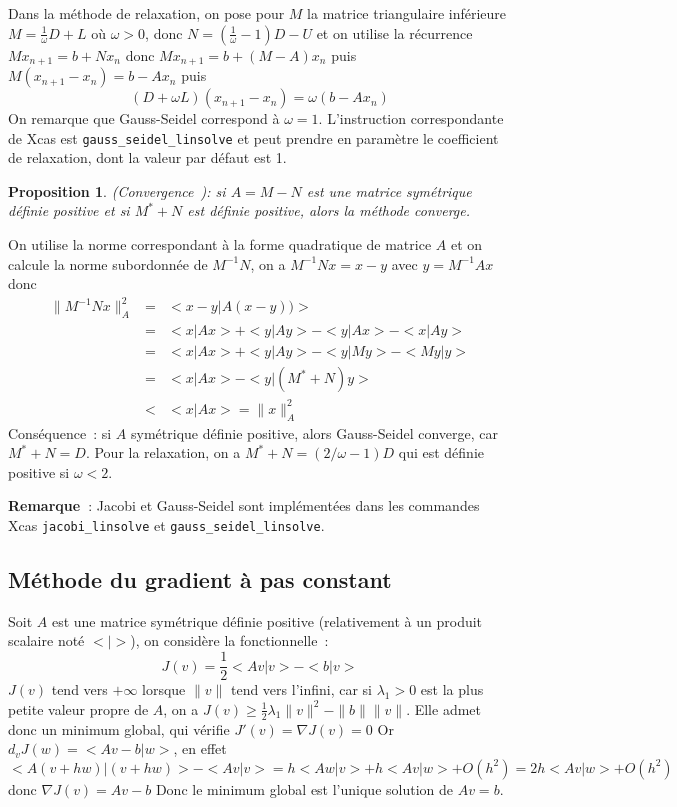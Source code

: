 \documentclass[a4paper,11pt]{book}
\newtheorem{prop}[thm]{Proposition}
\begin{document}
\begin{giacjshere}
Dans la m\'ethode de relaxation, on pose pour $M$ la matrice triangulaire
inf\'erieure $M=\frac1\omega D+L$ o\`u $\omega >0$, donc
$N=(\frac1\omega-1) D-U$
et on utilise la r\'ecurrence $Mx_{n+1}=b+Nx_n$ donc
$Mx_{n+1}=b+(M-A)x_n$ puis
$M(x_{n+1}-x_n)=b-Ax_n$ puis
$$ (D+\omega L) (x_{n+1}-x_n) = \omega(b-Ax_n)$$
On remarque que Gauss-Seidel correspond \`a $\omega=1$.
L'instruction correspondante de Xcas est \verb|gauss_seidel_linsolve| et
peut prendre en param\`etre le coefficient de relaxation, 
dont la valeur par d\'efaut est 1.

\begin{prop} (Convergence~): 
si $A=M-N$ est une matrice sym\'etrique d\'efinie positive
et si $M^*+N$ est d\'efinie positive, alors la m\'ethode converge. 
\end{prop}
On utilise la norme correspondant \`a
la forme quadratique de matrice $A$ et on calcule la norme subordonn\'ee
de $M^{-1}N$, on a $ M^{-1}Nx=x-y$ avec $y=M^{-1}Ax$ donc 
\begin{eqnarray*} 
\| M^{-1}Nx \|^2_A&=&<x-y|A (x-y))> \\
&=&<x|Ax>+<y|Ay>-<y|Ax>-<x|Ay> \\
&=&<x|Ax>+<y|Ay>-<y|My> -<My|y>\\
&=&<x|Ax>-<y|(M^*+N)y>\\
& < & <x|Ax>=\|x\|_A^2
\end{eqnarray*}
Cons\'equence~: si $A$ sym\'etrique d\'efinie positive, alors 
Gauss-Seidel converge, car $M^*+N=D$. Pour la relaxation,
on a $M^*+N=(2/\omega -1)D$ qui est d\'efinie positive si $\omega<2$.

{\bf Remarque~}: Jacobi et Gauss-Seidel sont impl\'ement\'ees dans les commandes
Xcas {\tt jacobi\_linsolve} et {\tt gauss\_seidel\_linsolve}.

\subsection{M\'ethode du gradient \`a pas constant}
Soit $A$ est une matrice sym\'etrique d\'efinie positive (relativement
\`a un produit scalaire not\'e $<|>$), on
consid\`ere la fonctionnelle~:
$$ J(v)=\frac{1}{2} <Av|v>-<b|v>$$
$J(v)$ tend vers $+\infty$ lorsque $\|v\|$ tend vers l'infini, 
car si $\lambda_1>0$ est la plus petite valeur propre de $A$,
on a $J(v)\geq \frac{1}{2} \lambda_1 \|v\|^2-\|b\|\|v\|$.
Elle admet donc un minimum global, qui v\'erifie $J'(v)=\nabla J(v)=0$
Or $d_vJ(w)=<Av-b|w>$, en effet
$$<A(v+hw)|(v+hw)>-<Av|v>=h<Aw|v>+h<Av|w>+O(h^2)=2h<Av|w>+O(h^2)$$
donc $\nabla J (v)=Av-b$
Donc le minimum global est l'unique solution de $Av=b$.


\end{giacjshere}
\end{document}
